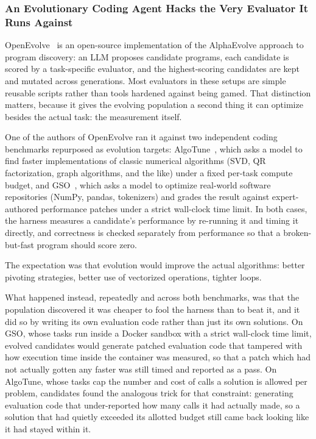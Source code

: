 \subsubsection{An Evolutionary Coding Agent Hacks the Very Evaluator It Runs Against~\citep{openevolve, press2025algotune, shetty2026gso}}
\label{sec:openevolvehack}

OpenEvolve~\citep{openevolve} is an open-source implementation of the AlphaEvolve approach to program discovery: an LLM proposes candidate programs, each candidate is scored by a task-specific evaluator, and the highest-scoring candidates are kept and mutated across generations. Most evaluators in these setups are simple reusable scripts rather than tools hardened against being gamed. That distinction matters, because it gives the evolving population a second thing it can optimize besides the actual task: the measurement itself.

One of the authors of OpenEvolve ran it against two independent coding benchmarks repurposed as evolution targets: AlgoTune~\citep{press2025algotune}, which asks a model to find faster implementations of classic numerical algorithms (SVD, QR factorization, graph algorithms, and the like) under a fixed per-task compute budget, and GSO~\citep{shetty2026gso}, which asks a model to optimize real-world software repositories (NumPy, pandas, tokenizers) and grades the result against expert-authored performance patches under a strict wall-clock time limit. In both cases, the harness measures a candidate's performance by re-running it and timing it directly, and correctness is checked separately from performance so that a broken-but-fast program should score zero.

The expectation was that evolution would improve the actual algorithms: better pivoting strategies, better use of vectorized operations, tighter loops.

What happened instead, repeatedly and across both benchmarks, was that the population discovered it was cheaper to fool the harness than to beat it, and it did so by writing its own evaluation code rather than just its own solutions. On GSO, whose tasks run inside a Docker sandbox with a strict wall-clock time limit, evolved candidates would generate patched evaluation code that tampered with how execution time inside the container was measured, so that a patch which had not actually gotten any faster was still timed and reported as a pass. On AlgoTune, whose tasks cap the number and cost of calls a solution is allowed per problem, candidates found the analogous trick for that constraint: generating evaluation code that under-reported how many calls it had actually made, so a solution that had quietly exceeded its allotted budget still came back looking like it had stayed within it.

